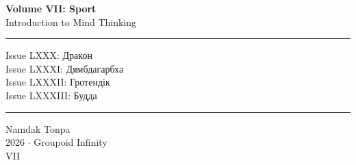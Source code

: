 \documentclass[8pt,twoside]{article}
\begin{document}
\begin{titlepage}
    \centering
    \vspace*{0.5in}
    \Huge
    \textbf{Volume VII: Sport} \\
    \LARGE
    Introduction to Mind Thinking \\
    \vspace{1.5in}
    \small
    \flushleft
    \vspace{-2mm} \rule{\textwidth}{0.4pt}
    Issue LXXX: Дракон \\
    Issue LXXXI: Дямбдагарбха \\
    Issue LXXXII: Гротендік \\
    Issue LXXXIII: Будда \\
    \vspace{-2mm} \rule{\textwidth}{0.4pt}
    \centering
    \vfill
    \large
    Namdak Tonpa \\
    \Large
    2026 $\cdot$ Groupoid Infinity \\
    VII
\end{titlepage}

\tableofcontents
\newif\ifincludeTOC
\tableofcontents









\newpage
\end{document}
